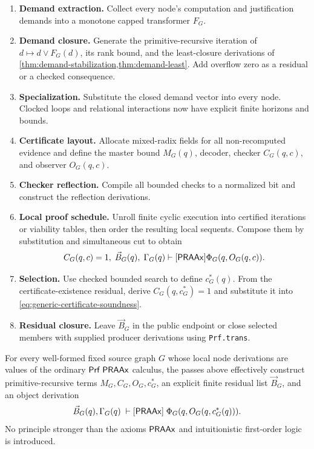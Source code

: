 \begin{enumerate}[label=\textbf{P\arabic*.},leftmargin=3.2em]
\item \textbf{Demand extraction.}  Collect every node's computation and justification demands into a monotone capped transformer \(F_G\).

\item \textbf{Demand closure.}  Generate the primitive-recursive iteration of \(d\mapsto d\vee F_G(d)\), its rank bound, and the least-closure derivations of \cref{thm:demand-stabilization,thm:demand-least}.  Add overflow zero as a residual or a checked consequence.

\item \textbf{Specialization.}  Substitute the closed demand vector into every node.  Clocked loops and relational interactions now have explicit finite horizons and bounds.

\item \textbf{Certificate layout.}  Allocate mixed-radix fields for all non-recomputed evidence and define the master bound \(M_G(q)\), decoder, checker \(C_G(q,c)\), and observer \(O_G(q,c)\).

\item \textbf{Checker reflection.}  Compile all bounded checks to a normalized bit and construct the reflection derivations.

\item \textbf{Local proof schedule.}  Unroll finite cyclic execution into certified iterations or viability tables, then order the resulting local sequents.  Compose them by substitution and simultaneous cut to obtain
\begin{equation}
  C_G(q,c)=1,\;\vec B_G(q),\;\Gamma_G(q)
  \vdash[\mathsf{PRAAx}]
  \Phi_G(q,O_G(q,c)).
  \label{eq:generic-certificate-soundness}
\end{equation}

\item \textbf{Selection.}  Use checked bounded search to define \(c_G^*(q)\).  From the certificate-existence residual, derive \(C_G(q,c_G^*)=1\) and substitute it into \eqref{eq:generic-certificate-soundness}.

\item \textbf{Residual closure.}  Leave \(\vec B_G\) in the public endpoint or close selected members with supplied producer derivations using \texttt{Prf.trans}.
\end{enumerate}

\begin{theorem}
\label{thm:finer-compilation}
For every well-formed fixed source graph \(G\) whose local node derivations are values of the ordinary \(\mathsf{Prf}\;\mathsf{PRAAx}\) calculus, the passes above effectively construct primitive-recursive terms \(M_G,C_G,O_G,c_G^*\), an explicit finite residual list \(\vec B_G\), and an object derivation
\begin{equation}
  \vec B_G(q),\Gamma_G(q)
  \;\vdash[\mathsf{PRAAx}]\;
  \Phi_G(q,O_G(q,c_G^*(q))).
  \label{eq:finer-compiled-theorem}
\end{equation}
No principle stronger than the axioms \(\mathsf{PRAAx}\) and intuitionistic first-order logic is introduced.
\end{theorem}

